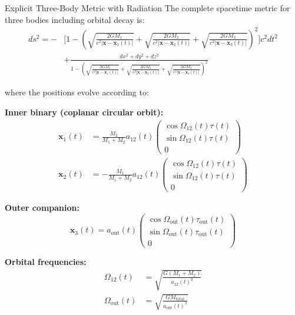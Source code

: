 \documentclass[11pt,a4paper]{article}
\theoremstyle{definition}
\theoremstyle{remark}
\begin{document}
	Explicit Three-Body Metric with Radiation\label{thm:complete_metric}
		The complete spacetime metric for three bodies including orbital decay is:
		\begin{equation}\label{eq:metric_complete}
			\boxed{
				\begin{aligned}
					ds^2 = -&\Bigg[1 - \left(\sqrt{\frac{2GM_1}{c^2|\mathbf{x}-\mathbf{x}_1(t)|}} + \sqrt{\frac{2GM_2}{c^2|\mathbf{x}-\mathbf{x}_2(t)|}} + \sqrt{\frac{2GM_3}{c^2|\mathbf{x}-\mathbf{x}_3(t)|}}\right)^2\Bigg]c^2dt^2 \\
					&+ \frac{dx^2 + dy^2 + dz^2}{1 - \left(\sqrt{\frac{2GM_1}{c^2|\mathbf{x}-\mathbf{x}_1(t)|}} + \sqrt{\frac{2GM_2}{c^2|\mathbf{x}-\mathbf{x}_2(t)|}} + \sqrt{\frac{2GM_3}{c^2|\mathbf{x}-\mathbf{x}_3(t)|}}\right)^2}
				\end{aligned}
			}
		\end{equation}
		
		\noindent where the positions evolve according to:
		
		\textbf{Inner binary (coplanar circular orbit):}
		\begin{align}
			\mathbf{x}_1(t) &= \frac{M_2}{M_1+M_2}a_{12}(t)\begin{pmatrix}\cos\Omega_{12}(t)\tau(t) \\ \sin\Omega_{12}(t)\tau(t) \\ 0\end{pmatrix} \label{eq:x1_trajectory}\\
			\mathbf{x}_2(t) &= -\frac{M_1}{M_1+M_2}a_{12}(t)\begin{pmatrix}\cos\Omega_{12}(t)\tau(t) \\ \sin\Omega_{12}(t)\tau(t) \\ 0\end{pmatrix} \label{eq:x2_trajectory}
		\end{align}
		
		\textbf{Outer companion:}
		\begin{equation}\label{eq:x3_trajectory}
			\mathbf{x}_3(t) = a_{\text{out}}(t)\begin{pmatrix}\cos\Omega_{\text{out}}(t)\tau_{\text{out}}(t) \\ \sin\Omega_{\text{out}}(t)\tau_{\text{out}}(t) \\ 0\end{pmatrix}
		\end{equation}
		
		\textbf{Orbital frequencies:}
		\begin{align}
			\Omega_{12}(t) &= \sqrt{\frac{G(M_1+M_2)}{a_{12}(t)^3}} \label{eq:Omega_inner}\\
			\Omega_{\text{out}}(t) &= \sqrt{\frac{GM_{\text{total}}}{a_{\text{out}}(t)^3}} \label{eq:Omega_outer}
		\end{align}
		
\end{document}
